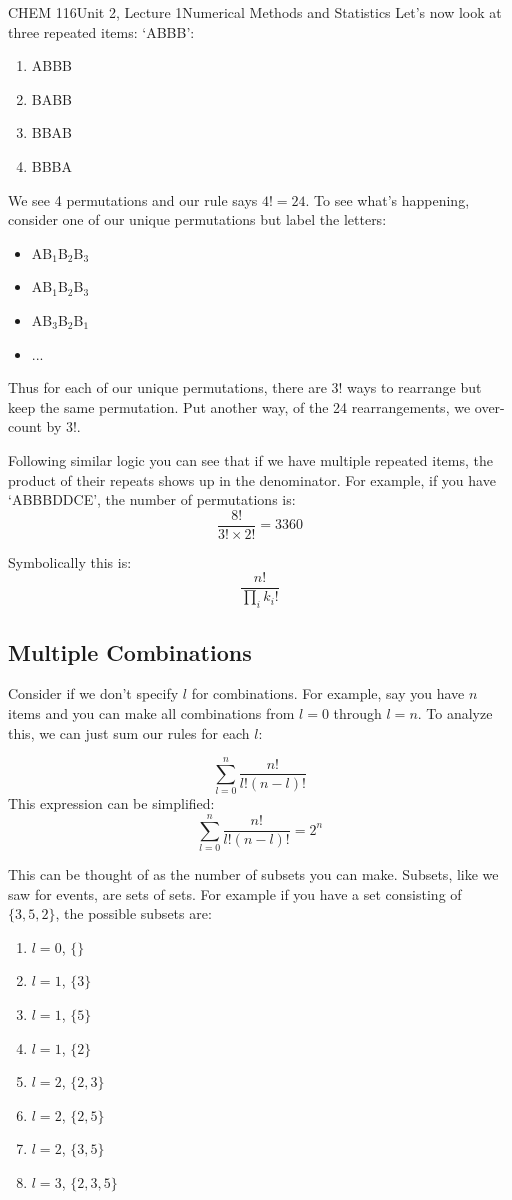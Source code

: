 \documentclass{article}
\begin{document}
\begin{tdoc}{CHEM 116}{Unit 2, Lecture 1}{Numerical Methods and Statistics}
Let's now look at three repeated items: `ABBB':
\begin{enumerate}
\item ABBB
\item BABB
\item BBAB
\item BBBA
\end{enumerate}

We see 4 permutations and our rule says $4!=24$. To see what's happening, consider one of our unique permutations but label the letters:
\begin{itemize}
\item AB$_1$B$_2$B$_3$
\item AB$_1$B$_2$B$_3$
\item AB$_3$B$_2$B$_1$
\item ...
\end{itemize}
Thus for each of our unique permutations, there are $3!$ ways to rearrange but keep the same permutation. Put another way, of the 24 rearrangements,
we over-count by $3!$.

Following similar logic you can see that if we have multiple repeated items, the product of their repeats shows up in the denominator. For example, if you have `ABBBDDCE', the number of permutations is:
\[
\frac{8!}{3!\times2!} = 3360  
\]

Symbolically this is:
\begin{equation}
  \frac{n!}{\prod_i k_i!}
\end{equation}

\subsection{Multiple Combinations}
Consider if we don't specify $l$ for combinations. For example, say you have $n$ items and you can make all combinations from $l=0$ through $l=n$. To analyze this, we can just sum our rules for each $l$:

\[
  \sum_{l=0}^n \frac{n!}{l!(n - l)!}  
\]
This expression can be simplified:
\begin{equation}
  \sum_{l=0}^n \frac{n!}{l!(n - l)!} = 2^n
\end{equation}

This can be thought of as the number of subsets you can make. Subsets, like we saw for events, are sets of sets. For example if you have a set consisting of $\{3, 5, 2\}$, the possible subsets are:
\begin{enumerate}
\item $l=0$, $\{\}$
\item $l=1$, $\{3\}$
\item $l=1$, $\{5\}$
\item $l=1$, $\{2\}$
\item $l=2$, $\{2, 3\}$
\item $l=2$, $\{2,5\}$
\item $l=2$, $\{3,5\}$
\item $l=3$, $\{2, 3, 5\}$
\end{enumerate}


\end{tdoc}
\end{document}
